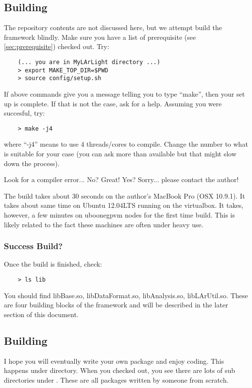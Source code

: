 
\subsection{Building \Core}

The repository contents are not discussed here, but we attempt build the framework blindly.
Make sure you have a list of prerequisite (see \ref{sec:prerequisite}) checked out.
Try:
\begin{lstlisting}
    (... you are in MyLArLight directory ...)
    > export MAKE_TOP_DIR=$PWD
    > source config/setup.sh
\end{lstlisting}

If above commands give you a message telling you to type ``make'', then your set up is complete.
If that is not the case, ask for a help. Assuming you were succesful, try:
\begin{lstlisting}
    > make -j4
\end{lstlisting}

where ``-j4'' means to use 4 threads/cores to compile. 
Change the number to what is suitable for your case (you can ask more than available but that might slow down the process).

Look for a compiler error... No? Great! Yes? Sorry... please contact the author!

The build takes about 30 seconds on the author's MacBook Pro (OSX 10.9.1). 
It takes about same time on Ubuntu 12.04LTS running on the virtualbox. 
It takes, however, a few minutes on uboonegpvm nodes for the first time build.
This is likely related to the fact these machines are often under heavy use.

\subsubsection{Success Build?}

Once the build is finished, check:
\begin{lstlisting}
    > ls lib
\end{lstlisting}
You should find {\ttfamily libBase.so, libDataFormat.so, libAnalysis.so, libLArUtil.so}. These are four building blocks of the framework and will be described in the later section of this document.  

\subsection{Building \UserDev}

I hope you will eventually write your own package and enjoy coding. This happens under \UserDev directory. When you checked out, you see there are lots of sub directories under \UserDev. These are all packages written by someone from scratch. 

